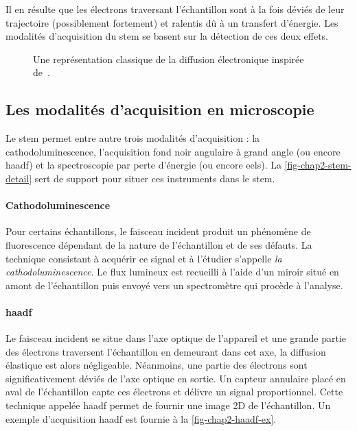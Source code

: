    Il en résulte que les électrons traversant l'échantillon sont à la fois déviés de leur trajectoire (possiblement fortement) et ralentis dû à un transfert d'énergie. Les modalités d'acquisition du \gls{stem} se basent sur la détection de ces deux effets.

    \begin{figure}
    	\centering
    	
        \vspace{1em}
    	\caption{Une représentation classique de la diffusion électronique inspirée de~\cite{egerton2011electron}.%
            \protect\label{fig-chap2-interactions}}
    \end{figure}


    \subsection{Les modalités d'acquisition en microscopie }

    Le \gls{stem} permet entre autre trois modalités d'acquisition : la cathodoluminescence, l'acquisition fond noir angulaire à grand angle (ou encore \gls{haadf}) et la spectroscopie par perte d'énergie (ou encore \gls{eels}). La \cref{fig-chap2-stem-detail} sert de support pour situer ces instruments dans le \gls{stem}.

    \paragraph*{Cathodoluminescence} Pour certains échantillons, le faisceau incident produit un phénomène de fluorescence dépendant de la nature de l'échantillon et de ses défauts. La technique consistant à acquérir ce signal et à l'étudier s'appelle \emph{la cathodoluminescence}. Le flux lumineux est recueilli à l'aide d'un miroir situé en amont de l'échantillon puis envoyé vers un spectromètre qui procède à l'analyse.

    \paragraph{\gls{haadf}} Le faisceau incident se situe dans l'axe optique de l'appareil et une grande partie des électrons traversent l'échantillon en demeurant dans cet axe, la diffusion élastique est alors négligeable. Néanmoins, une partie des électrons sont significativement déviés de l'axe optique en sortie.  Un capteur annulaire placé en aval de l'échantillon capte ces électrons et délivre un signal proportionnel. Cette technique appelée \gls{haadf} permet de fournir une image 2D de l'échantillon. Un exemple d'acquisition \gls{haadf} est fournie à la \cref{fig-chap2-haadf-ex}.

